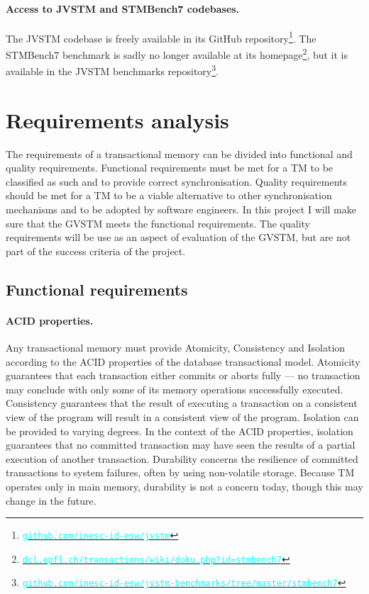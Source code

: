 \documentclass[12pt,a4paper,oneside,openright]{report}
\newcommand{\URL}[1]{\href{https://#1}{\textcolor{cyan}{\texttt{#1}}}}
\begin{document}
\paragraph{Access to JVSTM and STMBench7 codebases.} The JVSTM
codebase is freely available in its GitHub
repository\footnote{\URL{github.com/inesc-id-esw/jvstm}}. The
STMBench7 benchmark is sadly no longer available at its
homepage\footnote{\URL{dcl.epfl.ch/transactions/wiki/doku.php?id=stmbench7}},
but it is available in the JVSTM benchmarks
repository\footnote{\URL{github.com/inesc-id-esw/jvstm-benchmarks/tree/master/stmbench7}}.

\section{Requirements analysis}
\label{sec:requ-analys}

The requirements of a transactional memory can be divided into
functional and quality requirements. Functional requirements must be
met for a TM to be classified as such and to provide correct
synchronisation. Quality requirements should be met for a TM to be a
viable alternative to other synchronisation mechanisms and to be
adopted by software engineers. In this project I will make sure that
the GVSTM meets the functional requirements. The quality requirements
will be use as an aspect of evaluation of the GVSTM, but are not part
of the success criteria of the project.

\subsection{Functional requirements}
\label{sec:prep:techn-requ}

\paragraph{ACID properties.} Any transactional memory must provide
Atomicity, Consistency and Isolation according to the ACID properties
of the database transactional model. Atomicity guarantees that each
transaction either commits or aborts fully --- no transaction may
conclude with only some of its memory operations successfully
executed. Consistency guarantees that the result of executing a
transaction on a consistent view of the program will result in a
consistent view of the program. Isolation can be provided to varying
degrees. In the context of the ACID properties, isolation guarantees
that no committed transaction may have seen the results of a partial
execution of another transaction. Durability concerns the resilience
of committed transactions to system failures, often by using
non-volatile storage. Because TM operates only in main memory,
durability is not a concern today, though this may change in the
future.
\end{document}
